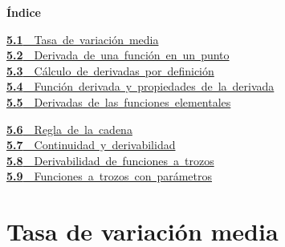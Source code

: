 \documentclass[11pt,a4paper]{article}
\begin{document}
\begin{tcolorbox}[colback=fmsurface,colframe=fmsurface,arc=3mm,left=4mm,right=4mm,top=2mm,bottom=2mm]
\small\textbf{Índice}\par\smallskip
\begin{minipage}[t]{0.49\linewidth}\small \mbox{\hyperlink{sec1}{\textbf{\color{fmgreen}5.1}\ \ Tasa de variación media}}\\[3pt]
\mbox{\hyperlink{sec2}{\textbf{\color{fmgreen}5.2}\ \ Derivada de una función en un punto}}\\[3pt]
\mbox{\hyperlink{sec3}{\textbf{\color{fmgreen}5.3}\ \ Cálculo de derivadas por definición}}\\[3pt]
\mbox{\hyperlink{sec4}{\textbf{\color{fmgreen}5.4}\ \ Función derivada y propiedades de la derivada}}\\[3pt]
\mbox{\hyperlink{sec5}{\textbf{\color{fmgreen}5.5}\ \ Derivadas de las funciones elementales}}\\[3pt]\end{minipage}\hfill\begin{minipage}[t]{0.49\linewidth}\small \mbox{\hyperlink{sec6}{\textbf{\color{fmgreen}5.6}\ \ Regla de la cadena}}\\[3pt]
\mbox{\hyperlink{sec7}{\textbf{\color{fmgreen}5.7}\ \ Continuidad y derivabilidad}}\\[3pt]
\mbox{\hyperlink{sec8}{\textbf{\color{fmgreen}5.8}\ \ Derivabilidad de funciones a trozos}}\\[3pt]
\mbox{\hyperlink{sec9}{\textbf{\color{fmgreen}5.9}\ \ Funciones a trozos con parámetros}}\\[3pt]\end{minipage}
\end{tcolorbox}

\section{Tasa de variación media}\hypertarget{sec1}{}

  
\end{document}
